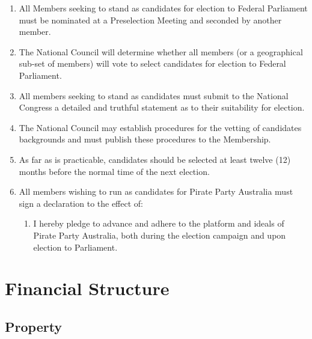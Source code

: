 \documentclass[a4paper,titlepage,8.5pt]{article}
\begin{document}
\begin{enumerate}
\item All Members seeking to stand as candidates for election to Federal Parliament must be nominated at a Preselection Meeting and seconded by another member.
\item The National Council will determine whether all members (or a geographical sub-set of members) will vote to select candidates for election to Federal Parliament.
\item All members seeking to stand as candidates must submit to the National Congress a detailed and truthful statement as to their suitability for election.
\item The National Council may establish procedures for the vetting of candidates backgrounds and must publish these procedures to the Membership.
\item As far as is practicable, candidates should be selected at least twelve (12) months before the normal time of the next election.
\item All members wishing to run as candidates for Pirate Party Australia must sign a declaration to the effect of:
\begin{enumerate}
	\item I hereby pledge to advance and adhere to the platform and ideals of Pirate Party Australia, both during the election campaign and upon election to Parliament.
\end{enumerate}
\end{enumerate}

\section{Financial Structure}

\subsection{Property}
\end{document}
